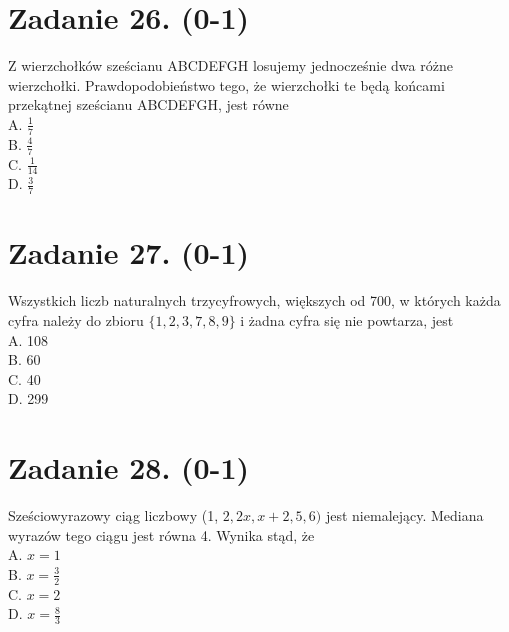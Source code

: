 \documentclass[10pt]{article}
\begin{document}
\section*{Zadanie 26. (0-1)}
Z wierzchołków sześcianu ABCDEFGH losujemy jednocześnie dwa różne wierzchołki. Prawdopodobieństwo tego, że wierzchołki te będą końcami przekątnej sześcianu ABCDEFGH, jest równe\\
A. \(\frac{1}{7}\)\\
B. \(\frac{4}{7}\)\\
C. \(\frac{1}{14}\)\\
D. \(\frac{3}{7}\)

\section*{Zadanie 27. (0-1)}
Wszystkich liczb naturalnych trzycyfrowych, większych od 700, w których każda cyfra należy do zbioru \(\{1,2,3,7,8,9\}\) i żadna cyfra się nie powtarza, jest\\
A. 108\\
B. 60\\
C. 40\\
D. 299

\section*{Zadanie 28. (0-1)}
Sześciowyrazowy ciąg liczbowy (1, \(2,2 x, x+2,5,6)\) jest niemalejący. Mediana wyrazów tego ciągu jest równa 4. Wynika stąd, że\\
A. \(x=1\)\\
B. \(x=\frac{3}{2}\)\\
C. \(x=2\)\\
D. \(x=\frac{8}{3}\)
\end{document}
